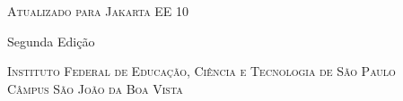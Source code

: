 {
    \thispagestyle{empty}
    
    \center
    
    \vspace*{4.5cm}
    \noindent
    \chaptitlefont\HUGE\textsc{\thetitle}
    
    {\chaptitlefont\large\textsc{Atualizado para Jakarta EE 10}}
    
    {\normalsize Segunda Edição}
    
    \vspace{4.5cm}
    \noindent
    \chaptitlefont\Large\textsc{\theauthor}
    
    \chaptitlefont\tiny\textsc{Instituto Federal de Educação, Ciência e Tecnologia de São Paulo}\\
    \chaptitlefont\tiny\textsc{Câmpus São João da Boa Vista}
        
    \vfill
    \restoregeometry
}